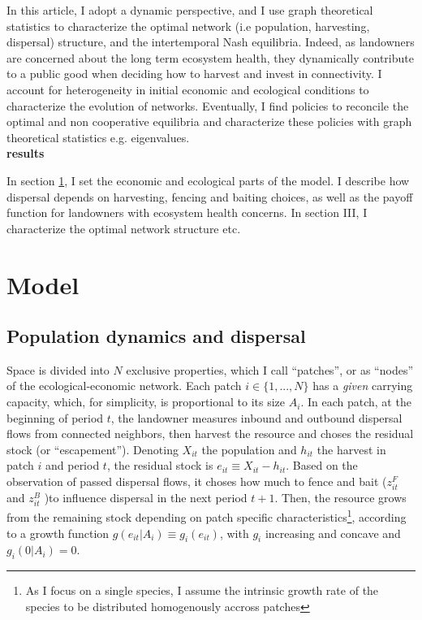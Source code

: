 \documentclass{article}
\begin{document}
In this article, I adopt a dynamic perspective, and I use graph theoretical statistics to characterize the optimal network (i.e population, harvesting, dispersal) structure,  and the intertemporal Nash equilibria. Indeed, as landowners are concerned about the long term ecosystem health, they dynamically contribute to a public good when deciding how to harvest and invest in connectivity. I account for heterogeneity in initial economic and ecological conditions to characterize the evolution of networks. Eventually, I find policies to reconcile the optimal and non cooperative equilibria and characterize these policies with graph theoretical statistics e.g. eigenvalues. \\
\textbf{results}

In section \ref{sec:model}, I set the economic and ecological parts of the model. I describe how dispersal depends on harvesting, fencing and baiting choices, as well as the payoff function for landowners with ecosystem health concerns. In section III, I characterize the optimal network structure etc. 


\section{Model}
\label{sec:model}
\subsection{Population dynamics and dispersal}

Space is divided into $N$ exclusive properties, which I call \enquote{patches}, or as \enquote{nodes} of the ecological-economic network. Each patch $i \in \{1,...,N\}$ has a \textit{given} carrying capacity, which, for simplicity, is proportional to its size $A_i$.
In each patch, at the beginning of period $t$, the landowner measures inbound and outbound dispersal flows from connected neighbors, then harvest the resource and choses the residual stock (or \enquote{escapement}). 
Denoting $X_{it}$ the population and $h_{it}$ the harvest in patch $i$ and period $t$, the residual stock is $e_{it} \equiv X_{it} - h_{it}$. Based on the observation of passed dispersal flows, it choses how much to fence and bait ($z_{it}^F$ and $z^B_{it}$ )to influence dispersal in the next period $t+1$. Then, the resource grows from the remaining stock depending on patch specific characteristics\footnote{As I focus on a single species, I assume the intrinsic growth rate of the species to be distributed homogenously accross patches}, according to a growth function $g(e_{it}| A_i) \equiv g_i(e_{it})$, with $g_i$ increasing and concave and $g_i(0|A_i)=0$. 
\end{document}

